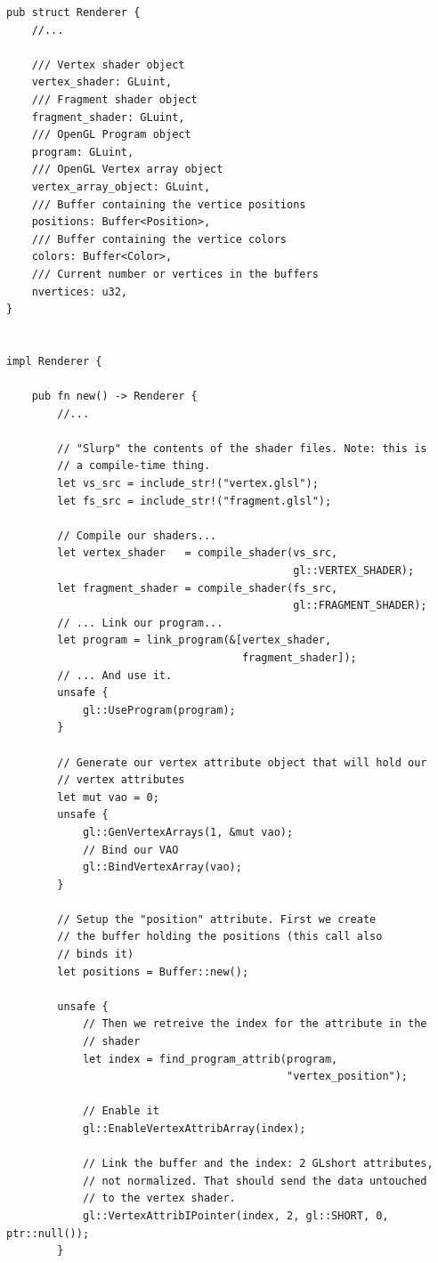 \documentclass[a4paper]{article}
\begin{document}
\begin{lstlisting}
pub struct Renderer {
    //...

    /// Vertex shader object
    vertex_shader: GLuint,
    /// Fragment shader object
    fragment_shader: GLuint,
    /// OpenGL Program object
    program: GLuint,
    /// OpenGL Vertex array object
    vertex_array_object: GLuint,
    /// Buffer containing the vertice positions
    positions: Buffer<Position>,
    /// Buffer containing the vertice colors
    colors: Buffer<Color>,
    /// Current number or vertices in the buffers
    nvertices: u32,
}


impl Renderer {

    pub fn new() -> Renderer {
        //...

        // "Slurp" the contents of the shader files. Note: this is
        // a compile-time thing.
        let vs_src = include_str!("vertex.glsl");
        let fs_src = include_str!("fragment.glsl");

        // Compile our shaders...
        let vertex_shader   = compile_shader(vs_src,
                                             gl::VERTEX_SHADER);
        let fragment_shader = compile_shader(fs_src,
                                             gl::FRAGMENT_SHADER);
        // ... Link our program...
        let program = link_program(&[vertex_shader,
                                     fragment_shader]);
        // ... And use it.
        unsafe {
            gl::UseProgram(program);
        }

        // Generate our vertex attribute object that will hold our
        // vertex attributes
        let mut vao = 0;
        unsafe {
            gl::GenVertexArrays(1, &mut vao);
            // Bind our VAO
            gl::BindVertexArray(vao);
        }

        // Setup the "position" attribute. First we create
        // the buffer holding the positions (this call also
        // binds it)
        let positions = Buffer::new();

        unsafe {
            // Then we retreive the index for the attribute in the
            // shader
            let index = find_program_attrib(program,
                                            "vertex_position");

            // Enable it
            gl::EnableVertexAttribArray(index);

            // Link the buffer and the index: 2 GLshort attributes,
            // not normalized. That should send the data untouched
            // to the vertex shader.
            gl::VertexAttribIPointer(index, 2, gl::SHORT, 0, ptr::null());
        }


\end{lstlisting}
\end{document}

